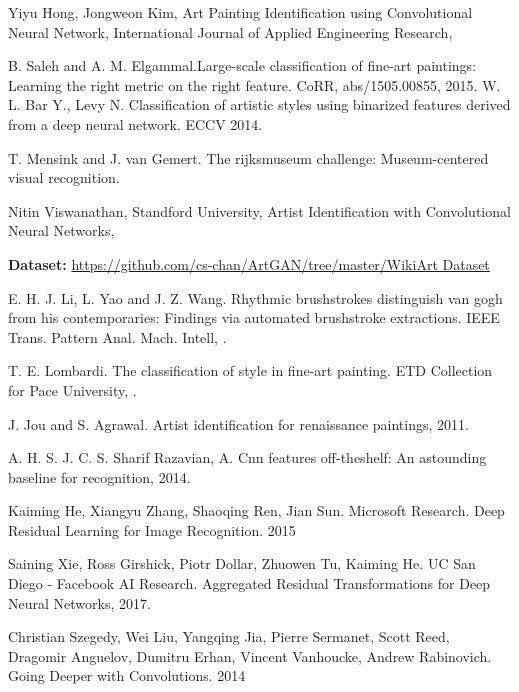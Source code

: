 \documentclass{article}
\begin{document}
\begin{thebibliography}{1}
	
	Yiyu Hong, Jongweon Kim, \newblock  Art Painting Identification using Convolutional Neural Network, \newblock International Journal of Applied Engineering Research, 
	
	B. Saleh and A. M. Elgammal.\newblock  Large-scale classification
	of fine-art paintings: Learning the right metric on the right
	feature. \newblock CoRR, abs/1505.00855, 2015.
	W. L. Bar Y., Levy N. Classification of artistic styles using binarized features derived from a deep neural network.
	ECCV 2014.
	
	T. Mensink and J. van Gemert. \newblock The rijksmuseum challenge:
	Museum-centered visual recognition. 
	
	
	Nitin Viswanathan, Standford University,
	\newblock Artist Identification with Convolutional Neural Networks, 
	
	\textbf{Dataset:}
	\url{https://github.com/cs-chan/ArtGAN/tree/master/WikiArt Dataset}
	
	E. H. J. Li, L. Yao and J. Z. Wang. \newblock Rhythmic brushstrokes
	distinguish van gogh from his contemporaries: Findings via
	automated brushstroke extractions. IEEE Trans. Pattern
	Anal. Mach. Intell, .
		
	T. E. Lombardi. \newblock The classification of style in fine-art painting. ETD Collection for Pace University, .
	
	J. Jou and S. Agrawal. Artist identification for renaissance
	paintings, 2011.
	
	A. H. S. J. C. S. Sharif Razavian, A. Cnn features off-theshelf: An astounding baseline for recognition, 2014.
	
	Kaiming He, Xiangyu Zhang, Shaoqing Ren, Jian Sun. Microsoft Research. 
	Deep Residual Learning for Image Recognition. 2015
	
	Saining Xie, Ross Girshick, Piotr Dollar, Zhuowen Tu, Kaiming He. UC San Diego - Facebook AI Research. Aggregated Residual Transformations for Deep Neural Networks, 2017.
	
	Christian Szegedy, Wei Liu, Yangqing Jia, Pierre Sermanet, Scott Reed, Dragomir Anguelov, Dumitru Erhan, Vincent Vanhoucke, Andrew Rabinovich. Going Deeper with Convolutions. 2014
	

\end{thebibliography}
\end{document}
